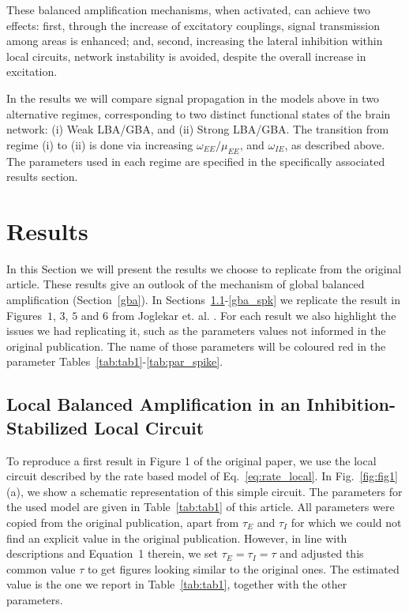 These balanced amplification mechanisms, when activated, can achieve two effects: first, through the increase of excitatory couplings, signal transmission among areas is enhanced; and, second, increasing the lateral inhibition within local circuits, network instability is avoided, despite the overall increase in excitation.

In the results we will compare signal propagation in the models above in two alternative regimes, corresponding to two distinct functional states of the brain network: (i) Weak LBA/GBA, and (ii) Strong LBA/GBA. The transition from regime (i) to (ii) is done via increasing $\omega_{EE}/\mu_{EE}$, and $\omega_{IE}$, as described above. The parameters used in each regime are specified in the specifically associated results section.


\section{Results}

In this Section we will present the results we choose to replicate from the original article. These results give an outlook of the  mechanism of global balanced amplification (Section~\ref{gba}). In Sections~\ref{lba_result}-\ref{gba_spk}
 we replicate the result in Figures~$1$, $3$, $5$ and $6$ from Joglekar et. al. \cite{joglekar2018inter}.  For each result we also highlight the issues we had replicating it, such as the parameters values not informed in the original publication. The name of those parameters  will be coloured red in the parameter Tables~\ref{tab:tab1}-\ref{tab:par_spike}.

\subsection{Local Balanced Amplification in an Inhibition-Stabilized Local Circuit}\label{lba_result}

To reproduce a first result in Figure 1 of the original \cite{joglekar2018inter} paper, we use the local circuit described by the rate based model of Eq.~\ref{eq:rate_local}. In Fig.~\ref{fig:fig1}(a), we show a schematic representation of this simple circuit. The parameters for the used model are given in Table~\ref{tab:tab1} of this article. All parameters were copied from the original publication, apart from $\tau_{E}$ and $\tau_{I}$ for which we could not find an explicit value in the original publication. However, in line with descriptions and Equation~1 therein, we set  $\tau_{E} = \tau_{I}= \tau$ and adjusted this common value $\tau$ to get figures looking similar to the original ones. The estimated value is the one we report in Table~\ref{tab:tab1}, together with the other parameters.

